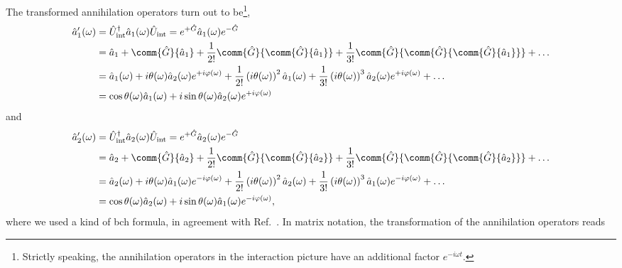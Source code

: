 The transformed annihilation operators turn out to be\footnote{Strictly speaking, the annihilation operators in the interaction picture have an additional factor $e^{-i\omega t}$.},
\begin{equation}
	\begin{split}
		\hat{a}_1^\prime(\omega)
		&=
		\hat{U}_\text{int}^\dagger
		\hat{a}_1(\omega)
		\hat{U}_\text{int}
		=
		e^{+\hat{G}}
		\hat{a}_1(\omega)
		e^{-\hat{G}}
		\\
		&=
		\hat{a}_1
		+
		\comm{\hat{G}}{\hat{a}_1}
		+
		\frac{1}{2!}
		\comm{\hat{G}}{\comm{\hat{G}}{\hat{a}_1}}
		+
		\frac{1}{3!}
		\comm{\hat{G}}{\comm{\hat{G}}{\comm{\hat{G}}{\hat{a}_1}}}
		+
		\dots
		\\
		&=
		\hat{a}_1(\omega)
		+
		i\theta(\omega)
		\hat{a}_2(\omega)
		e^{+i\varphi(\omega)}
		+
		\frac{1}{2!}
		\left(i\theta(\omega)\right)^2
		\hat{a}_1(\omega)
		+
		\frac{1}{3!}
		\left(i\theta(\omega)\right)^3
		\hat{a}_2(\omega)
		e^{+i\varphi(\omega)}
		+
		\dots
		\\
		&=
		\cos\theta(\omega)
		\hat{a}_1(\omega)
		+
		i\sin\theta(\omega)
		\hat{a}_2(\omega)
		e^{+i\varphi(\omega)}
	\end{split}
\end{equation}
and
\begin{equation}
	\begin{split}
		\hat{a}_2^\prime(\omega)
		&=
		\hat{U}_\text{int}^\dagger
		\hat{a}_2(\omega)
		\hat{U}_\text{int}
		=
		e^{+\hat{G}}
		\hat{a}_2(\omega)
		e^{-\hat{G}}
		\\
		&=
		\hat{a}_2
		+
		\comm{\hat{G}}{\hat{a}_2}
		+
		\frac{1}{2!}
		\comm{\hat{G}}{\comm{\hat{G}}{\hat{a}_2}}
		+
		\frac{1}{3!}
		\comm{\hat{G}}{\comm{\hat{G}}{\comm{\hat{G}}{\hat{a}_2}}}
		+
		\dots
		\\
		&=
		\hat{a}_2(\omega)
		+
		i\theta(\omega)
		\hat{a}_1(\omega)
		e^{-i\varphi(\omega)}
		+
		\frac{1}{2!}
		\left(i\theta(\omega)\right)^2
		\hat{a}_2(\omega)
		+
		\frac{1}{3!}
		\left(i\theta(\omega)\right)^3
		\hat{a}_1(\omega)
		e^{-i\varphi(\omega)}
		+
		\dots
		\\
		&=
		\cos\theta(\omega)
		\hat{a}_2(\omega)
		+
		i\sin\theta(\omega)
		\hat{a}_1(\omega)
		e^{-i\varphi(\omega)}
		,
	\end{split}
\end{equation}
where we used a kind of \gls{bch} formula, in agreement with Ref.~\cite[p.~131]{Haroche2006}.
In matrix notation, the transformation of the annihilation operators reads
